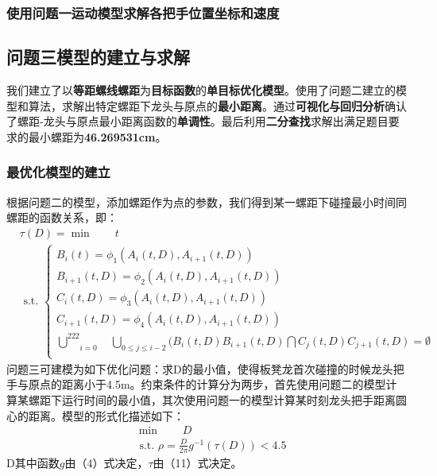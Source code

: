 \documentclass[a4paper]{article}
\begin{document}
        \subsubsection{使用问题一运动模型求解各把手位置坐标和速度}
	\subsection{问题三模型的建立与求解}
 我们建立了以\textbf{等距螺线螺距}为\textbf{目标函数}的\textbf{单目标优化模型}。使用了问题二建立的模型和算法，求解出特定螺距下龙头与原点的\textbf{最小距离}。通过\textbf{可视化与回归分析}确认了螺距-龙头与原点最小距离函数的\textbf{单调性}。最后利用\textbf{二分查找}求解出满足题目要求的最小螺距为\textbf{46.269531cm}。
	\subsubsection{最优化模型的建立}
 根据问题二的模型，添加螺距作为点的参数，我们得到某一螺距下碰撞最小时间同螺距的函数关系，即：
 		\begin{equation}
   \begin{aligned}
				& \tau(D) = \min \quad \quad t \\
				& \text { s.t. }\left\{\begin{array}{l}
                        B_i(t) = \phi_1(A_i(t, D), A_{i + 1}(t, D))\\
                        B_{i + 1}(t, D) = \phi_2(A_i(t, D), A_{i + 1}(t, D))\\
                        C_i(t, D) = \phi_3(A_i(t, D), A_{i + 1}(t, D))\\
                        C_{i + 1}(t, D) = \phi_4(A_i(t, D), A_{i + 1}(t, D))\\
               \underset{i=0}{\overset{222}{\bigcup}}\quad \underset{0\leq j \leq i - 2}{\bigcup}(B_i(t, D)B_{i + 1}(t, D)\bigcap C_j(t,D)C_{j + 1}(t, D) = \emptyset

  \\

				\end{array}\right.
    \end{aligned}
		\end{equation}
 问题三可建模为如下优化问题：求D的最小值，使得板凳龙首次碰撞的时候龙头把手与原点的距离小于4.5m。约束条件的计算分为两步，首先使用问题二的模型计算某螺距下运行时间的最小值，其次使用问题一的模型计算某时刻龙头把手距离圆心的距离。模型的形式化描述如下：
   		\begin{equation}
   \begin{aligned}
				& \min \quad \quad D \\
				& \text { s.t. }
    \rho = \frac{D}{2 \pi} g^{-1}(\tau(D))< 4.5
    \end{aligned}
		\end{equation}
      D其中函数$g$由（4）式决定，$\tau$由（11）式决定。
\end{document}
